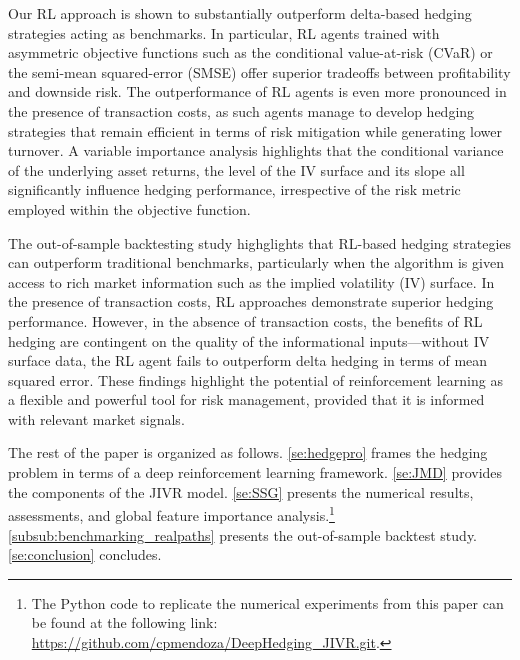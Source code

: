 \documentclass[12pt]{article}
\begin{document}
Our RL approach is shown to substantially outperform delta-based hedging strategies acting as benchmarks. In particular, RL agents trained with asymmetric objective functions such as the conditional value-at-risk (CVaR) or the semi-mean squared-error (SMSE) offer superior tradeoffs between profitability and downside risk. 
The outperformance of RL agents is even more pronounced in the presence of transaction costs, as such agents manage to develop hedging strategies that remain efficient in terms of risk mitigation while generating lower turnover. 
A variable importance analysis highlights that the conditional variance of the underlying asset returns, the level of the IV surface and its slope all significantly influence hedging performance, irrespective of the risk metric employed within the objective function.

The out-of-sample backtesting study highglights that RL-based hedging strategies can outperform traditional benchmarks, particularly when the algorithm is given access to rich market information such as the implied volatility (IV) surface. In the presence of transaction costs, RL approaches demonstrate superior hedging performance. However, in the absence of transaction costs, the benefits of RL hedging are contingent on the quality of the informational inputs—without IV surface data, the RL agent fails to outperform delta hedging in terms of mean squared error. These findings highlight the potential of reinforcement learning as a flexible and powerful tool for risk management, provided that it is informed with relevant market signals.

The rest of the paper is organized as follows. \cref{se:hedgepro} frames the hedging problem in terms of a deep reinforcement learning framework. \cref{se:JMD} provides the components of the JIVR model. \cref{se:SSG} presents the numerical results, assessments, and global feature importance analysis.\footnote{The Python code to replicate the numerical experiments from this paper can be found at the following link: \href{https://github.com/cpmendoza/DeepHedging_JIVR.git}{https://github.com/cpmendoza/DeepHedging\_JIVR.git}.} \cref{subsub:benchmarking_realpaths} presents the out-of-sample backtest study.  \cref{se:conclusion} concludes.



\end{document}
